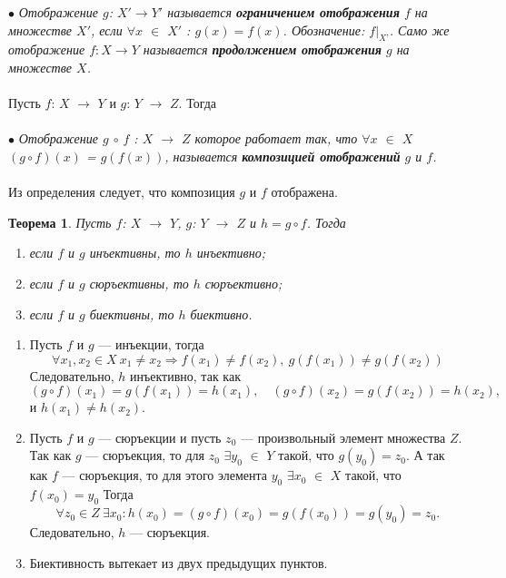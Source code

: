 $\bullet$ \textit{Отображение $g$: $X' \rightarrow Y'$ называется \textbf{ограничением отображения} $f$ на множестве $X'$, если $\forall x$ $\in$ $X'$ : $g(x) = f(x)$. Обозначение: $f|_\textit{X'}$. Само же отображение $f:X\rightarrow Y$ называется \textbf{продолжением отображения} $g$ на множестве $X$.}\\\\
Пусть $f$: $X$ $\rightarrow$ $Y$ и $g$: $Y$ $\rightarrow$ $Z$. Тогда\\\\
$\bullet$ \textit{Отображение $g$ $\circ$ $f$ : $X$ $\rightarrow$ $Z$ которое работает так, что $\forall x$ $\in$ $X$ $(g \circ f)(x)$ = $g(f(x))$, называется \textbf{композицией отображений} $g$ и $f$.}\\\\
Из определения следует, что композиция $g$ и $f$ отображена.
\newtheorem*{t6_2}{Теорема}\begin{t6_2} Пусть $f$: $X$ $\rightarrow$ $Y$, $g$: $Y$ $\rightarrow$ $Z$ и $h = g \circ f$. Тогда
	\begin{enumerate}
		\item если $f$ и $g$ инъективны, то $h$ инъективно;
		\item если $f$ и $g$ сюръективны, то $h$ сюръективно;
		\item если $f$ и $g$ биективны, то $h$ биективно.
	\end{enumerate}
\end{t6_2} \begin{Proof} \begin{enumerate}
		\item Пусть $f$ и $g$ --- инъекции, тогда $$\forall x_1, x_2 \in X\ x_1 \not= x_2 \Rightarrow f(x_1) \not= f(x_2),\ g(f(x_1)) \not= g(f(x_2))$$ Следовательно, $h$ инъективно, так как $$(g\circ f)(x_1) = g(f(x_1)) = h(x_1),\quad (g\circ f)(x_2) = g(f(x_2)) = h(x_2),$$ и $h(x_1) \not= h(x_2)$.
		\item Пусть $f$ и $g$ --- сюръекции и пусть $z_0$ --- произвольный элемент множества $Z$. Так как $g$ --- сюръекция, то для $z_0$ $\exists y_0$ $\in$ $Y$ такой, что $g(y_0) = z_0$. А так как $f$ --- сюръекция, то для этого элемента $y_0$ $\exists x_0$ $\in$ $X$ такой, что $f(x_0) = y_0$ Тогда $$\forall z_0 \in Z\ \exists x_0 : h(x_0) = (g \circ f)(x_0) = g(f(x_0)) = g(y_0) = z_0.$$ Следовательно, $h$ --- сюръекция.
		\item Биективность вытекает из двух предыдущих пунктов.
\end{enumerate} \end{Proof}\\
